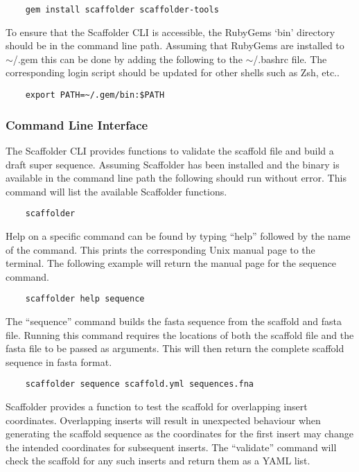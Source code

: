 \documentclass[10pt]{bmc_article}
\newenvironment{bmcformat}{\begin{raggedright}\baselineskip20pt\sloppy\setboolean{publ}{false}}{\end{raggedright}\baselineskip20pt\sloppy}
\begin{document}
\begin{bmcformat}
  \begin{verbatim}
    gem install scaffolder scaffolder-tools
  \end{verbatim}

To ensure that the Scaffolder CLI is accessible, the RubyGems `bin' directory
should be in the command line path. Assuming that RubyGems are installed to
$\sim$/.gem this can be done by adding the following to the $\sim$/.bashrc
file. The corresponding login script should be updated for other shells such as
Zsh, etc.. \pb

  \begin{verbatim}
    export PATH=~/.gem/bin:$PATH
  \end{verbatim}

\subsubsection*{Command Line Interface} %

The Scaffolder CLI provides functions to validate the scaffold file and build
a draft super sequence. Assuming Scaffolder has been installed and the binary
is available in the command line path the following should run without error.
This command will list the available Scaffolder functions. \pb

  \begin{verbatim}
    scaffolder
  \end{verbatim}

Help on a specific command can be found by typing ``help'' followed by the
name of the command. This prints the corresponding Unix manual page to the
terminal. The following example will return the manual page for the sequence
command. \pb

  \begin{verbatim}
    scaffolder help sequence
  \end{verbatim} 

The ``sequence'' command builds the fasta sequence from the scaffold and fasta
file. Running this command requires the locations of both the scaffold file
and the fasta file to be passed as arguments. This will then return the
complete scaffold sequence in fasta format. \pb

  \begin{verbatim}
    scaffolder sequence scaffold.yml sequences.fna
  \end{verbatim}

Scaffolder provides a function to test the scaffold for overlapping insert
coordinates. Overlapping inserts will result in unexpected behaviour when
generating the scaffold sequence as the coordinates for the first insert may
change the intended coordinates for subsequent inserts. The ``validate''
command will check the scaffold for any such inserts and return them as a YAML
list. \pb


\end{bmcformat}
\end{document}
